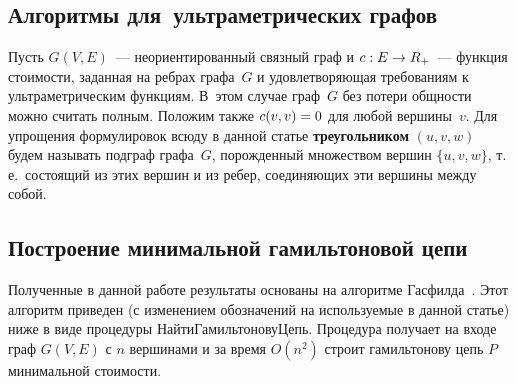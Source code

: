 \begin{multicols}{2}
\section{Алгоритмы для~ультраметрических графов}

Пусть $G(V,E)$~--- неориентированный связный граф и $c: E\hm\rightarrow
R_{+}$~--- функция стоимости, заданная на ребрах графа~$G$ и
удовлетворяющая требованиям к ультраметрическим функциям. В~этом
случае граф~$G$ без потери общности можно считать полным. Положим
также $c(v,v)\hm=0$ для любой вершины~$v$. Для упрощения формулировок
всюду в данной статье \textbf{треугольником} $(u,v,w)$ будем называть
подграф графа~$G$, порожденный множеством вершин $\{ u, v, w\}$,
т.\,е.\ состоящий из этих вершин и из ребер, соединяющих эти вершины
между собой.

\subsection{Построение минимальной гамильтоновой цепи}

Полученные в данной работе результаты основаны на алгоритме Гас\-фил\-да~\cite{Gusfield}.
Этот алгоритм приведен (с изменением обозначений на используемые в данной статье) ниже в виде процедуры {\sf НайтиГамильтоновуЦепь}.
Процедура получает на входе граф $G(V,E)$ с $n$ вершинами и за время $O(n^2)$
строит гамильтонову цепь $P$ минимальной стои\-мости.

\medskip

{\centering
{}
}



\end{multicols}

